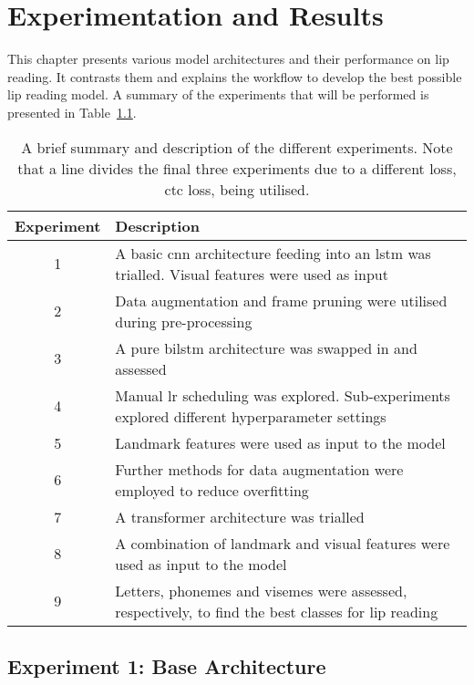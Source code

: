 \chapter{Experimentation and Results}
\label{cha:results}
\graphicspath{ {./experiments/} }
This chapter presents various model architectures and their performance on lip reading. It contrasts them and explains the workflow to develop the best possible lip reading model.
A summary of the experiments that will be performed is presented in Table~\ref{table: experiment summary}.
\begin{table}[h]
\centering
\begin{tabular}{|c|p{100mm}|} 
 \hline
 Experiment & Description\\
 \hline
 1 & A basic \acrshort{cnn} architecture feeding into an \acrshort{lstm} was trialled. Visual features were used as input\\
 2 & Data augmentation and frame pruning were utilised during pre-processing\\ 
 3 & A pure \acrshort{bilstm} architecture was swapped in and assessed\\
 4 & Manual \acrshort{lr} scheduling was explored. Sub-experiments explored different hyperparameter settings\\
 5 & Landmark features were used as input to the model\\
 6 & Further methods for data augmentation were employed to reduce \gls{overfitting}\\
 7 & A \gls{transformer} architecture was trialled \\
 8 & A combination of landmark and visual features were used as input to the model\\
 \hline
 9 & Letters, \gls{phoneme}s and \gls{viseme}s were assessed, respectively, to find the best classes for lip reading \\
 \hline
\end{tabular}
\caption[A brief summary and description of the different experiments]{A brief summary and description of the different experiments. Note that a line divides the final three experiments due to a different loss, \acrshort{ctc} loss, being utilised.}
\label{table: experiment summary}
\end{table}
\section{Experiment 1: Base Architecture}
\label{sec: Experiment 1}
